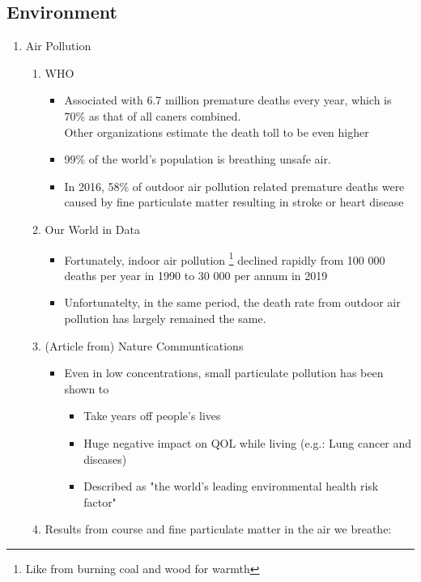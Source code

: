 \documentclass[oneside]{book}
\begin{document}
\subsection{Environment}
\begin{enumerate}
    \item Air Pollution
    \begin{enumerate}
        \item WHO \begin{itemize}
            \item Associated with 6.7 million premature deaths every year, which is 70\% as that of all caners combined.\\
            Other organizations estimate the death toll to be even higher
           \item 99\% of the world's population is breathing unsafe air.
           \item In 2016, 58\% of outdoor air pollution related premature deaths were caused by fine particulate matter resulting in stroke or heart disease 
        \end{itemize} 
        \item Our World in Data
        \begin{itemize}
            \item Fortunately, indoor air pollution \footnote{Like from burning coal and wood for warmth} declined rapidly from 100 000 deaths per year in 1990 to 30 000 per annum in 2019
            \item Unfortunatelty, in the same period, the death rate from outdoor air pollution has largely remained the same.
        \end{itemize}
        \item (Article from) Nature Communtications \begin{itemize}
            \item Even in low concentrations, small particulate pollution has been shown to 
            \begin{itemize}
                \item Take years off people's lives
                \item Huge negative impact on QOL while living \footnotesize (e.g.: Lung cancer and diseases) \normalsize
                \item Described as "the world's leading environmental health risk factor" 
            \end{itemize} 
        \end{itemize}
        \item Results from course and fine particulate matter in the air we breathe:

\end{enumerate}
\end{enumerate}
\end{document}
